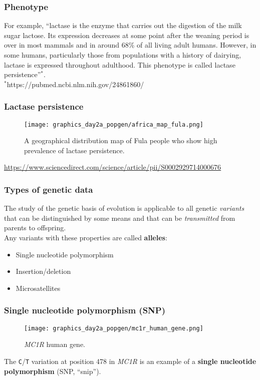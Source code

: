 \documentclass{beamer}
\newcommand{\1}{\ensuremath{\mathbf{1}}}
\begin{document}
\begin{frame}\frametitle{Phenotype}
	For example, ``lactase is the enzyme that carries out the digestion of the milk sugar lactose. Its expression decreases at some point after the weaning period is over in most mammals and in around 68\% of all living adult humans. However, in some humans, particularly those from populations with a history of dairying, lactase is expressed throughout adulthood. This phenotype is called lactase persistence''$^{*}$.\\[2ex]
	 {\small $^{*}$https://pubmed.ncbi.nlm.nih.gov/24861860/}
\end{frame}
%
%
%
\begin{frame}\frametitle{Lactase persistence}
	\begin{figure}
	\begin{center}
		\texttt{[image: graphics\_day2a\_popgen/africa\_map\_fula.png]}
	\end{center}
	\caption{A geographical distribution map of Fula people who show high prevalence of lactase persistence.}
	\end{figure}
	 {\scriptsize \url{https://www.sciencedirect.com/science/article/pii/S0002929714000676}}
\end{frame}
%
%
%
\begin{frame}\frametitle{Types of genetic data}
	The study of the genetic basis of evolution is applicable to all genetic \emph{variants} that can be distinguished by some means and that can be \emph{transmitted} from parents to offspring.\\[2ex]
	Any variants with these properties are called \textbf{alleles}:
	\begin{itemize}
		\item Single nucleotide polymorphism
		\item Insertion/deletion
		\item Microsatellites
	\end{itemize}
\end{frame}
%
%
%
\begin{frame}\frametitle{Single nucleotide polymorphism (SNP)}
	\begin{figure}
	\begin{center}
		\texttt{[image: graphics\_day2a\_popgen/mc1r\_human\_gene.png]}
	\end{center}
	\caption{\emph{MC1R} human gene.}
	\end{figure}
	The \texttt{C}/\texttt{T} variation at position 478 in \emph{MC1R} is an example of a \textbf{single nucleotide polymorphism} (SNP, ``snip'').
\end{frame}
\end{document}
